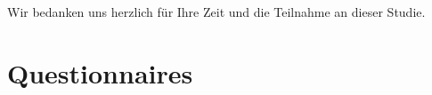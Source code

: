 Wir bedanken uns herzlich für Ihre Zeit und die Teilnahme an dieser Studie.


\chapter{Questionnaires}





 

%
%
%
%
%
